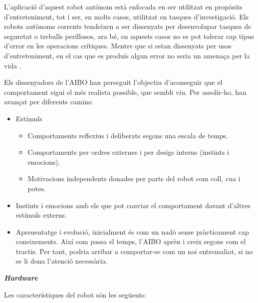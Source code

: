 \documentclass[12pt,a4paper,final,twoside]{article}
\begin{document}
L'aplicació d'aquest robot autònom està enfocada en ser utilitzat en propòsits d'entreteniment, tot i ser, en molts casos, utilitzat en tasques d'investigació. Els robots autònoms corrents tendeixen a ser dissenyats per desenvolupar tasques de seguretat o treballs perillosos, ara bé, en aquests casos no es pot tolerar cap tipus d'error en les operacions crítiques. Mentre que si estan dissenyats per usos d'entreteniment, en el cas que es produís algun error no seria un amenaça per la vida \cite{Fujita2000}.

Els dissenyadors de l'AIBO han perseguit l'objectiu d'aconseguir que el comportament sigui el més realista possible, que sembli viu. Per assolir-ho, han avançat per diferents camins:
\begin{itemize}
\item Estímuls
\begin{itemize}
\item Comportaments reflexius i deliberats segons una escala de temps.
\item Comportaments per ordres externes i per desigs interns (instints i emocions).
\item Motivacions independents donades per parts del robot com coll, cua i potes.
\end{itemize}
\item Instints i emocions amb els que pot canviar el comportament davant d'altres estímuls externs.
\item Aprenentatge i evolució, inicialment és com un nadó sense pràcticament cap coneixements. Així com passa el temps, l'AIBO aprèn i creix segons com el tractis. Per tant, podria arribar a comportar-se com un noi entremaliat, si no se li dona l'atenció necessària.
\end{itemize}



\vspace{20pt}
\textbf{\textit{Hardware}}
\label{Hardware}

Les característiques del robot són les següents: \cite{Anshar2007}
\end{document}
